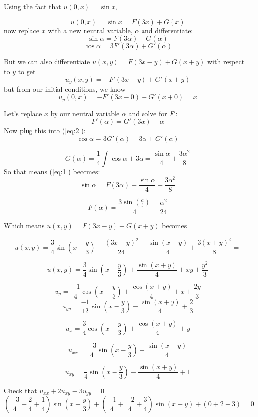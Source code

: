 \documentclass[
]{article}
\begin{document}
Using the fact that \(u(0,x)=\sin{x}\),

\begin{equation} \label{eq:1} u(0,x)=\sin{x}=F(3x)+G(x) \end{equation}
now replace \(x\) with a new neutral variable, \(\alpha\) and
differentiate: \[\sin{\alpha}=F(3\alpha)+G(\alpha) \]
\begin{equation} \label{eq:2} \cos{\alpha}=3F'(3\alpha)+G'(\alpha) \end{equation}

But we can also differentiate \(u(x,y)=F(3x-y)+G(x+y)\) with respect to
\(y\) to get \[u_y(x,y)=-F'(3x-y)+G'(x+y)\] but from our initial
conditions, we know \[u_y(0,x)=-F'(3x-0)+G'(x+0)=x\]

Let's replace \(x\) by our neutral variable \(\alpha\) and solve for
\(F'\): \[F'(\alpha)=G'(3\alpha)-\alpha\] Now plug this into
(\ref{eq:2}): \[\cos{\alpha}=3G'(\alpha)-3\alpha+G'(\alpha)\]

\[G(\alpha)= \frac{1}{4} \int {\cos{\alpha}+3\alpha} = \frac{\sin{\alpha}}{4}+ \frac{3 \alpha^2}{8} \]
So that means (\ref{eq:1}) becomes:
\[\sin{\alpha}=F(3\alpha)+\frac{\sin{\alpha}}{4}+ \frac{3 \alpha^2}{8}\]

\[F(\alpha)=\frac{3\sin{(\frac{\alpha}{3})}}{4}- \frac{\alpha^2}{24}\]

Which means \(u(x,y)=F(3x-y)+G(x+y)\) becomes

\[u(x,y)=\frac{3}{4}\sin{\left(x-\frac{y}{3}\right)}- \frac{(3x-y)^2}{24}+  \frac{\sin{(x+y)}}{4}+ \frac{3(x+y)^2}{8}=\]

\begin{tcolorbox}[colback=white, title=Solution]
$$u(x,y)=\frac{3}{4}\sin{\left(x-\frac{y}{3}\right)}+\frac{\sin{(x+y)}}{4}+ xy+  \frac{y^2}{3} $$
\end{tcolorbox}

\begin{tcolorbox}[colback=blue!5!white,colframe=blue!75!black,title=Check solution]

 $$u_y=\frac{-1}{4}\cos{\left(x-\frac{y}{3}\right)}+\frac{\cos{(x+y)}}{4}+ x+  \frac{2y}{3} $$
  $$u_{yy}=\frac{-1}{12}\sin{\left(x-\frac{y}{3}\right)}-\frac{\sin{(x+y)}}{4}+ \frac{2}{3} $$
 
$$u_x=\frac{3}{4}\cos{\left(x-\frac{y}{3}\right)}+\frac{\cos{(x+y)}}{4}+y$$
 
$$u_{xx}=\frac{-3}{4} \sin{\left( x-\frac{y}{3} \right)} - \frac{\sin{(x+y)}}{4}$$
  
  
$$u_{xy}=\frac{1}{4}\sin{\left(x-\frac{y}{3}\right)}-\frac{\sin{(x+y)}}{4}+1$$


Check that $u_{xx}+2u_{xy}-3u_{yy}=0$
$$
\left(\frac{-3}{4}+ \frac{2}{4}+\frac{1}{4}\right)\sin{\left(x-\frac{y}{3}\right)}+
\left(\frac{-1}{4}+ \frac{-2}{4}+\frac{3}{4}\right)\sin{(x+y)}+(0+2-3)=0
$$

\end{tcolorbox}
\end{document}
